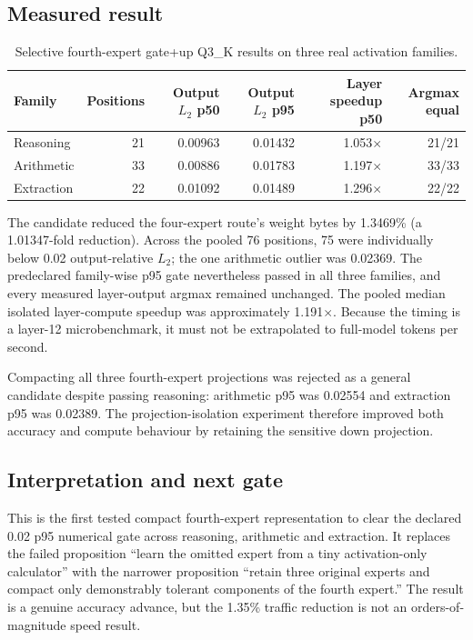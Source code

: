 \subsection{Measured result}

\begin{table}[htbp]
\centering
\small
\begin{tabularx}{\linewidth}{lrrrrr}
\toprule
Family & Positions & Output $L_2$ p50 & Output $L_2$ p95 & Layer speedup p50 & Argmax equal \\
\midrule
Reasoning  & 21 & 0.00963 & 0.01432 & 1.053$\times$ & 21/21 \\
Arithmetic & 33 & 0.00886 & 0.01783 & 1.197$\times$ & 33/33 \\
Extraction & 22 & 0.01092 & 0.01489 & 1.296$\times$ & 22/22 \\
\bottomrule
\end{tabularx}
\caption{Selective fourth-expert gate+up Q3\_K results on three real activation families.}
\end{table}

The candidate reduced the four-expert route's weight bytes by
1.3469\% (a 1.01347-fold reduction).  Across the pooled 76 positions, 75 were
individually below 0.02 output-relative $L_2$; the one arithmetic outlier was
0.02369.  The predeclared family-wise p95 gate nevertheless passed in all
three families, and every measured layer-output argmax remained unchanged.
The pooled median isolated layer-compute speedup was approximately
1.191$\times$.  Because the timing is a layer-12 microbenchmark, it must not be
extrapolated to full-model tokens per second.

Compacting all three fourth-expert projections was rejected as a general
candidate despite passing reasoning: arithmetic p95 was 0.02554 and extraction
p95 was 0.02389.  The projection-isolation experiment therefore improved both
accuracy and compute behaviour by retaining the sensitive down projection.

\subsection{Interpretation and next gate}

This is the first tested compact fourth-expert representation to clear the
declared 0.02 p95 numerical gate across reasoning, arithmetic and extraction.
It replaces the failed proposition ``learn the omitted expert from a tiny
activation-only calculator'' with the narrower proposition ``retain three
original experts and compact only demonstrably tolerant components of the
fourth expert.''  The result is a genuine accuracy advance, but the 1.35\%
traffic reduction is not an orders-of-magnitude speed result.

